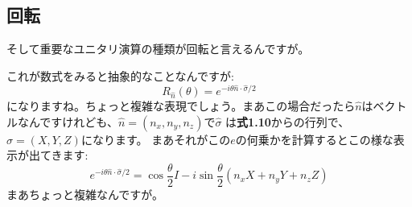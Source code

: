 \subsection{回転}
そして重要なユニタリ演算の種類が回転と言えるんですが。

これが数式をみると抽象的なことなんですが:
\begin{equation}
R_{\hat{n}}(\theta)=e^{-i \theta \hat{n} \cdot \hat{\sigma} / 2}
\end{equation}
になりますね。ちょっと複雑な表現でしょう。まあこの場合だったら$\hat{n}$はベクトルなんですけれども、$\hat{n} = (n_x, n_y, n_z)$で$\hat{\sigma}$ は\textbf{式1.10}からの行列で、 $\hat{\sigma} = (X,Y,Z)$になります。
まあそれがこの$e$の何乗かを計算するとこの様な表示が出てきます:
\begin{equation}
e^{-i \theta \hat{n} \cdot \hat{\sigma} / 2 }=\cos \frac{\theta}{2} I-i \sin \frac{\theta}{2}\left(n_{x} X+n_{y} Y+n_{z} Z\right)
\end{equation}
まあちょっと複雑なんですが。

